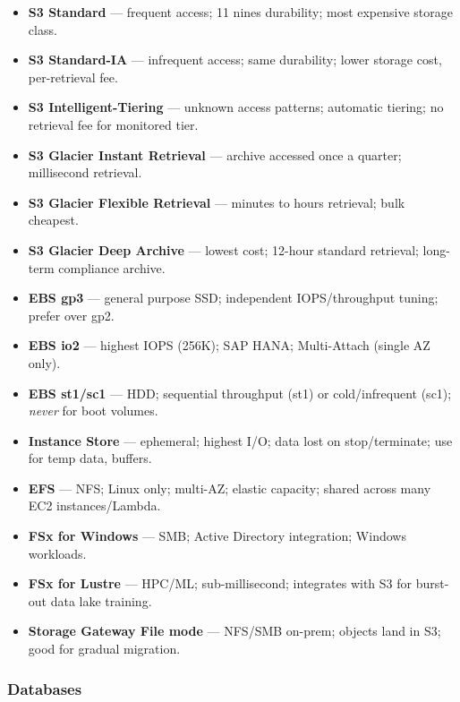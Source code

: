 \begin{keyfacts}
\begin{itemize}
  \item \textbf{S3 Standard} --- frequent access; 11 nines durability; most expensive storage class.
  \item \textbf{S3 Standard-IA} --- infrequent access; same durability; lower storage cost, per-retrieval fee.
  \item \textbf{S3 Intelligent-Tiering} --- unknown access patterns; automatic tiering; no retrieval fee for monitored tier.
  \item \textbf{S3 Glacier Instant Retrieval} --- archive accessed once a quarter; millisecond retrieval.
  \item \textbf{S3 Glacier Flexible Retrieval} --- minutes to hours retrieval; bulk cheapest.
  \item \textbf{S3 Glacier Deep Archive} --- lowest cost; 12-hour standard retrieval; long-term compliance archive.
  \item \textbf{EBS gp3} --- general purpose SSD; independent IOPS/throughput tuning; prefer over gp2.
  \item \textbf{EBS io2} --- highest IOPS (256K); SAP HANA; Multi-Attach (single AZ only).
  \item \textbf{EBS st1/sc1} --- HDD; sequential throughput (st1) or cold/infrequent (sc1); \emph{never} for boot volumes.
  \item \textbf{Instance Store} --- ephemeral; highest I/O; data lost on stop/terminate; use for temp data, buffers.
  \item \textbf{EFS} --- NFS; Linux only; multi-AZ; elastic capacity; shared across many EC2 instances/Lambda.
  \item \textbf{FSx for Windows} --- SMB; Active Directory integration; Windows workloads.
  \item \textbf{FSx for Lustre} --- HPC/ML; sub-millisecond; integrates with S3 for burst-out data lake training.
  \item \textbf{Storage Gateway File mode} --- NFS/SMB on-prem; objects land in S3; good for gradual migration.
\end{itemize}
\end{keyfacts}

\subsubsection{Databases}

